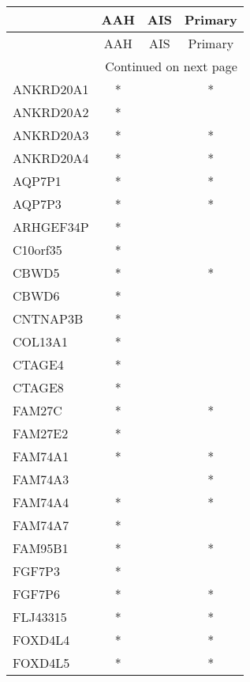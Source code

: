 \begin{longtable}{lccc}
\toprule
{} & AAH & AIS & Primary \\
\midrule
\endfirsthead

\toprule
{} & AAH & AIS & Primary \\
\midrule
\endhead
\midrule
\multicolumn{4}{r}{{Continued on next page}} \\
\midrule
\endfoot

\bottomrule
\endlastfoot
ANKRD20A1          &   * &     &       * \\
ANKRD20A2          &   * &     &         \\
ANKRD20A3          &   * &     &       * \\
ANKRD20A4          &   * &     &       * \\
AQP7P1             &   * &     &       * \\
AQP7P3             &   * &     &       * \\
ARHGEF34P          &   * &     &         \\
C10orf35           &   * &     &         \\
CBWD5              &   * &     &       * \\
CBWD6              &   * &     &         \\
CNTNAP3B           &   * &     &         \\
COL13A1            &   * &     &         \\
CTAGE4             &   * &     &         \\
CTAGE8             &   * &     &         \\
FAM27C             &   * &     &       * \\
FAM27E2            &   * &     &         \\
FAM74A1            &   * &     &       * \\
FAM74A3            &     &     &       * \\
FAM74A4            &   * &     &       * \\
FAM74A7            &   * &     &         \\
FAM95B1            &   * &     &       * \\
FGF7P3             &   * &     &         \\
FGF7P6             &   * &     &       * \\
FLJ43315           &   * &     &       * \\
FOXD4L4            &   * &     &       * \\
FOXD4L5            &   * &     &       * \\

\end{longtable}
